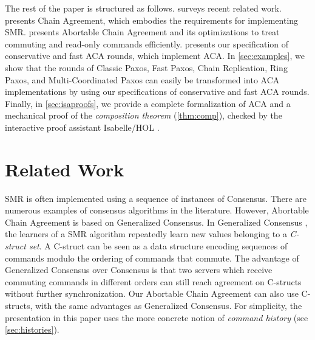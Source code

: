 The rest of the paper is structured as follows.
 surveys recent related work.  presents Chain
Agreement, which embodies the requirements for implementing SMR. 
presents Abortable Chain Agreement and its optimizations to treat commuting
and read-only commands efficiently.  presents our specification
of conservative and fast ACA rounds, which implement ACA. In
\cref{sec:examples}, we show that the rounds of  
Classic Paxos, Fast Paxos, Chain Replication, Ring Paxos,
and Multi-Coordinated Paxos can easily be transformed into ACA implementations
by using our specifications of conservative and fast ACA rounds.
Finally, in \cref{sec:isaproofs}, we provide a complete formalization of ACA
and a mechanical proof of the \emph{composition theorem} (\cref{thm:comp}),
checked by the interactive proof assistant Isabelle/HOL \cite{NipkowPaulsonWenzel02IsabelleHOL}. 

\begin{comment}
Abortable Chain Agreement builds on several recent advances in SMR
algorithms: ACA allows acceptors to only eventually reach agreement,
like in Generalized Paxos \cite{Lamport05GeneralizeConsensus},
boosting performance when most commands commute; ACA allows fast
execution of read commands like in Generalized Lattice Agreement
\cite{FalerioETAL12GeneralizedLatticeAgreement}; ACA implementations
can tolerate $f$ faults with only $f+1$ replicas and replace crashed replicas
upon changing round, as in Vertical Paxos  \cite{LamportMalkhiZhou09VerticalPaxosPrimarybackupReplication}.  
\end{comment}

\section{Related Work}
\label{sec:related}

SMR is often implemented using a sequence of instances of Consensus.
There are numerous examples of consensus algorithms in the literature.
However, Abortable Chain Agreement is based on Generalized Consensus. 
In Generalized Consensus \cite{Lamport05GeneralizeConsensus}, the learners of a
SMR algorithm repeatedly learn new values belonging to a \emph{C-struct set}. A
C-struct can be seen as a data structure encoding  sequences of commands modulo
the ordering of commands that commute. The advantage of Generalized
Consensus over Consensus is that
two servers which receive commuting commands in different orders can still reach
agreement on C-structs without further synchronization. 
Our Abortable Chain Agreement can also use C-structs, with the same advantages
as Generalized Consensus. For simplicity, the presentation in this
paper uses the more concrete notion of \emph{command history} (see
\cref{sec:histories}).

